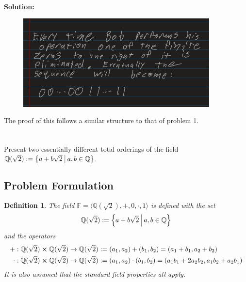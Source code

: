 \documentclass[]{article}
\newcommand{\Q}{\mathbb{Q}}
\newcommand{\st}{ \ \vline \ }
\newtheorem{definition}{Definition}
\begin{document}
\textbf{Solution:}
\begin{figure}[h]
    \centering
    \includegraphics[width=\textwidth]{MidExam1_pblm3_e.png}
\end{figure}

The proof of this follows a similar structure to that of problem 1.









\newpage
\section{}
Present two essentially different total orderings of the field 
$\Q(\sqrt{2}) := \qty{a + b \sqrt{2} \st a,b \in \Q}$.
\subsection*{Problem Formulation}
\begin{definition}
    The field $\mathbb{F} = \langle\Q(\sqrt{2}),+,0,\cdot,1\rangle$ is defined with the set
    $$\Q(\sqrt{2}) := \qty{a + b \sqrt{2} \st a,b \in \Q}$$
    and the operators
    \begin{align*}
        + : \Q(\sqrt{2}) \cross \Q(\sqrt{2}) \to \Q(\sqrt{2}) 
            &:= (a_1,a_2) + (b_1,b_2) = (a_1 + b_1, a_2 + b_2)\\
        \cdot : \Q(\sqrt{2}) \cross \Q(\sqrt{2}) \to \Q(\sqrt{2}) 
            &:= (a_1,a_2) \cdot (b_1,b_2) = (a_1 b_1 + 2 a_2 b_2, a_1 b_2 + a_2 b_1)
    \end{align*}
    It is also assumed that the standard field properties all apply.
\end{definition}

\end{document}
